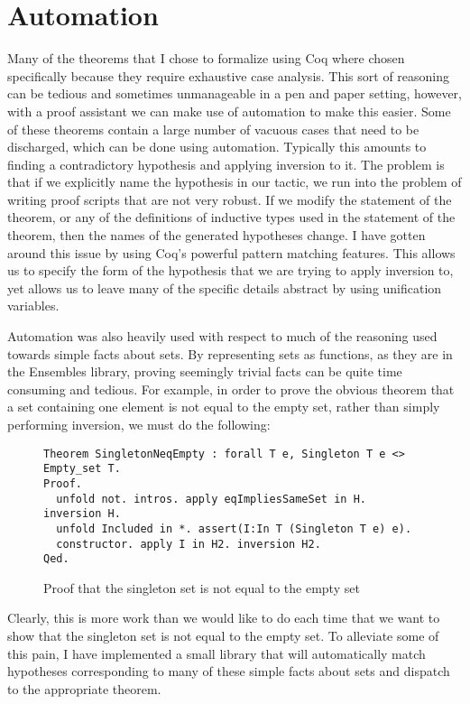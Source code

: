 \documentclass[11pt]{article}
\begin{document}
\section{Automation}
Many of the theorems that I chose to formalize using Coq where chosen specifically because they require exhaustive case analysis.  This sort of reasoning can be tedious and sometimes unmanageable in a pen and paper setting, however, with a proof assistant we can make use of automation to make this easier.  Some of these theorems contain a large number of vacuous cases that need to be discharged, which can be done using automation.  Typically this amounts to finding a contradictory hypothesis and applying inversion to it.  The problem is that if we explicitly name the hypothesis in our tactic, we run into the problem of writing proof scripts that are not very robust.  If we modify the statement of the theorem, or any of the definitions of inductive types used in the statement of the theorem, then the names of the generated hypotheses change.  I have gotten around this issue by using Coq's powerful pattern matching features.  This allows us to specify the form of the hypothesis that we are trying to apply inversion to, yet allows us to leave many of the specific details abstract by using unification variables.  

Automation was also heavily used with respect to much of the reasoning used towards simple facts about sets.  By representing sets as functions, as they are in the Ensembles library, proving seemingly trivial facts can be quite time consuming and tedious.  For example, in order to prove the obvious theorem that a set containing one element is not equal to the empty set, rather than simply performing inversion, we must do the following:

\begin{figure}[H]
\begin{lstlisting}[morekeywords={Theorem, for all, intros, unfold, assert, inversion, constructor, apply, Proof, Qed, in},  keywordstyle=\color{blue}]
Theorem SingletonNeqEmpty : forall T e, Singleton T e <> Empty_set T. 
Proof.
  unfold not. intros. apply eqImpliesSameSet in H. inversion H. 
  unfold Included in *. assert(I:In T (Singleton T e) e). 
  constructor. apply I in H2. inversion H2. 
Qed. 
\end{lstlisting}
\caption{Proof that the singleton set is not equal to the empty set}
\end{figure}

Clearly, this is more work than we would like to do each time that we want to show that the singleton set is not equal to the empty set.  To alleviate some of this pain, I have implemented a small library that will automatically match hypotheses corresponding to many of these simple facts about sets and dispatch to the appropriate theorem.
\end{document}
